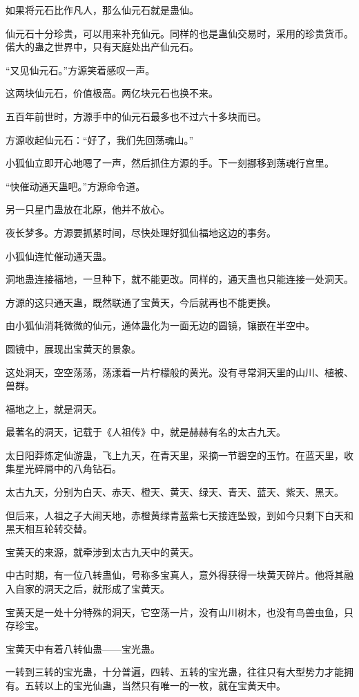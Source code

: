 \begin{this_body}
如果将元石比作凡人，那么仙元石就是蛊仙。

仙元石十分珍贵，可以用来补充仙元。同样的也是蛊仙交易时，采用的珍贵货币。偌大的蛊之世界中，只有天庭处出产仙元石。

“又见仙元石。”方源笑着感叹一声。

这两块仙元石，价值极高。两亿块元石也换不来。

五百年前世时，方源手中的仙元石最多也不过六十多块而已。

方源收起仙元石：“好了，我们先回荡魂山。”

小狐仙立即开心地嗯了一声，然后抓住方源的手。下一刻挪移到荡魂行宫里。

“快催动通天蛊吧。”方源命令道。

另一只星门蛊放在北原，他并不放心。

夜长梦多。方源要抓紧时间，尽快处理好狐仙福地这边的事务。

小狐仙连忙催动通天蛊。

洞地蛊连接福地，一旦种下，就不能更改。同样的，通天蛊也只能连接一处洞天。

方源的这只通天蛊，既然联通了宝黄天，今后就再也不能更换。

由小狐仙消耗微微的仙元，通体蛊化为一面无边的圆镜，镶嵌在半空中。

圆镜中，展现出宝黄天的景象。

这处洞天，空空荡荡，荡漾着一片柠檬般的黄光。没有寻常洞天里的山川、植被、兽群。

福地之上，就是洞天。

最著名的洞天，记载于《人祖传》中，就是赫赫有名的太古九天。

太日阳莽炼定仙游蛊，飞上九天，在青天里，采摘一节碧空的玉竹。在蓝天里，收集星光碎屑中的八角钻石。

太古九天，分别为白天、赤天、橙天、黄天、绿天、青天、蓝天、紫天、黑天。

但后来，人祖之子大闹天地，赤橙黄绿青蓝紫七天接连坠毁，到如今只剩下白天和黑天相互轮转交替。

宝黄天的来源，就牵涉到太古九天中的黄天。

中古时期，有一位八转蛊仙，号称多宝真人，意外得获得一块黄天碎片。他将其融入自家的洞天之后，就形成了宝黄天。

宝黄天是一处十分特殊的洞天，它空荡一片，没有山川树木，也没有鸟兽虫鱼，只存珍宝。

宝黄天中有着八转仙蛊——宝光蛊。

一转到三转的宝光蛊，十分普遍，四转、五转的宝光蛊，往往只有大型势力才能拥有。五转以上的宝光仙蛊，当然只有唯一的一枚，就在宝黄天中。


\end{this_body}
